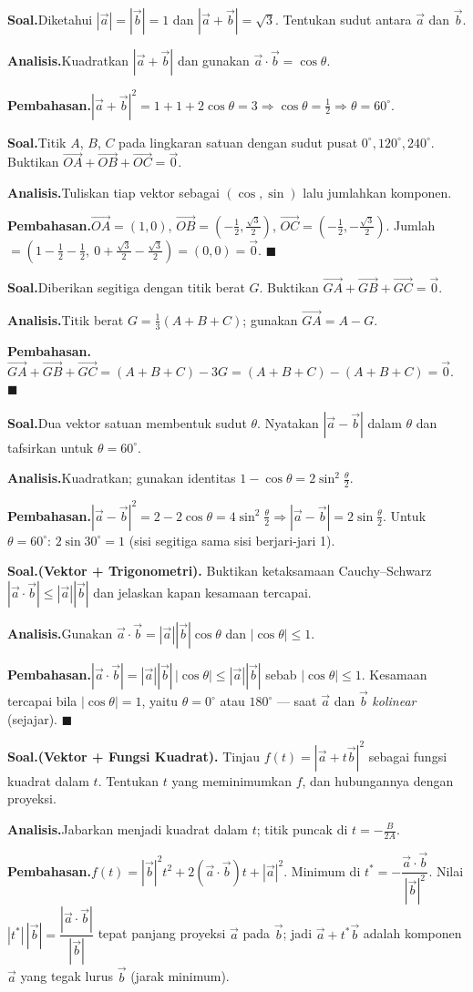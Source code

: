 \documentclass[11pt,a4paper]{report}
\theoremstyle{gaya}
\newcommand{\knomor}[1]{\par\medskip\noindent{\bfseries\color{ungu}#1}\par\nopagebreak}
\newcommand{\ksoal}{\noindent\textbf{\color{biru}Soal.}\space}
\newcommand{\kanalisis}{\par\noindent\textbf{\color{oranye}Analisis.}\space}
\newcommand{\kbahas}{\par\noindent\textbf{\color{hijau}Pembahasan.}\space}
\newcommand{\kbagian}[1]{\par\medskip\noindent{\large\bfseries\color{biru}#1}\par\smallskip}
\begin{document}
\knomor{C.2}
\ksoal Diketahui $|\vec a|=|\vec b|=1$ dan $|\vec a+\vec b|=\sqrt3$. Tentukan sudut antara $\vec a$ dan $\vec b$.
\kanalisis Kuadratkan $|\vec a+\vec b|$ dan gunakan $\vec a\cdot\vec b=\cos\theta$.
\kbahas $|\vec a+\vec b|^2=1+1+2\cos\theta=3\Rightarrow\cos\theta=\tfrac12\Rightarrow\theta=60^\circ.$

\knomor{C.3}
\ksoal Titik $A$, $B$, $C$ pada lingkaran satuan dengan sudut pusat $0^\circ, 120^\circ, 240^\circ$. Buktikan $\vec{OA}+\vec{OB}+\vec{OC}=\vec 0$.
\kanalisis Tuliskan tiap vektor sebagai $(\cos,\sin)$ lalu jumlahkan komponen.
\kbahas $\vec{OA}=(1,0)$, $\vec{OB}=(-\tfrac12,\tfrac{\sqrt3}{2})$, $\vec{OC}=(-\tfrac12,-\tfrac{\sqrt3}{2})$. Jumlah $=(1-\tfrac12-\tfrac12,\ 0+\tfrac{\sqrt3}{2}-\tfrac{\sqrt3}{2})=(0,0)=\vec0.$ $\blacksquare$

\knomor{C.4}
\ksoal Diberikan segitiga dengan titik berat $G$. Buktikan $\vec{GA}+\vec{GB}+\vec{GC}=\vec0$.
\kanalisis Titik berat $G=\tfrac13(A+B+C)$; gunakan $\vec{GA}=A-G$.
\kbahas $\vec{GA}+\vec{GB}+\vec{GC}=(A+B+C)-3G=(A+B+C)-(A+B+C)=\vec0.$ $\blacksquare$

\knomor{C.5}
\ksoal Dua vektor satuan membentuk sudut $\theta$. Nyatakan $|\vec a-\vec b|$ dalam $\theta$ dan tafsirkan untuk $\theta=60^\circ$.
\kanalisis Kuadratkan; gunakan identitas $1-\cos\theta=2\sin^2\tfrac\theta2$.
\kbahas $|\vec a-\vec b|^2=2-2\cos\theta=4\sin^2\tfrac\theta2\Rightarrow|\vec a-\vec b|=2\sin\tfrac\theta2.$ Untuk $\theta=60^\circ$: $2\sin30^\circ=1$ (sisi segitiga sama sisi berjari-jari 1).

\kbagian{Bagian D}

\knomor{D.1}
\ksoal \textbf{(Vektor + Trigonometri).} Buktikan ketaksamaan Cauchy--Schwarz $|\vec a\cdot\vec b|\le|\vec a||\vec b|$ dan jelaskan kapan kesamaan tercapai.
\kanalisis Gunakan $\vec a\cdot\vec b=|\vec a||\vec b|\cos\theta$ dan $|\cos\theta|\le1$.
\kbahas $|\vec a\cdot\vec b|=|\vec a||\vec b|\,|\cos\theta|\le|\vec a||\vec b|$ sebab $|\cos\theta|\le1$. Kesamaan tercapai bila $|\cos\theta|=1$, yaitu $\theta=0^\circ$ atau $180^\circ$ --- saat $\vec a$ dan $\vec b$ \emph{kolinear} (sejajar). $\blacksquare$

\knomor{D.2}
\ksoal \textbf{(Vektor + Fungsi Kuadrat).} Tinjau $f(t)=|\vec a+t\vec b|^2$ sebagai fungsi kuadrat dalam $t$. Tentukan $t$ yang meminimumkan $f$, dan hubungannya dengan proyeksi.
\kanalisis Jabarkan menjadi kuadrat dalam $t$; titik puncak di $t=-\tfrac{B}{2A}$.
\kbahas $f(t)=|\vec b|^2t^2+2(\vec a\cdot\vec b)t+|\vec a|^2$. Minimum di $t^*=-\dfrac{\vec a\cdot\vec b}{|\vec b|^2}$. Nilai $|t^*|\,|\vec b|=\dfrac{|\vec a\cdot\vec b|}{|\vec b|}$ tepat panjang proyeksi $\vec a$ pada $\vec b$; jadi $\vec a+t^*\vec b$ adalah komponen $\vec a$ yang tegak lurus $\vec b$ (jarak minimum).
\end{document}
